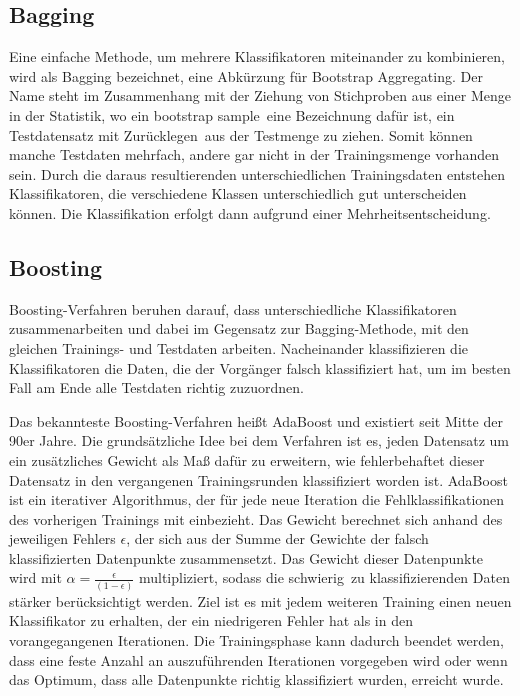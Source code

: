 \subsection*{Bagging}
Eine einfache Methode, um mehrere Klassifikatoren miteinander zu kombinieren, wird als Bagging bezeichnet, eine Abkürzung für Bootstrap Aggregating. Der Name steht im Zusammenhang mit der Ziehung von Stichproben aus einer Menge in der Statistik, wo ein \glqq bootstrap sample\grqq\ eine Bezeichnung dafür ist, ein Testdatensatz \glqq mit Zurücklegen\grqq\ aus der Testmenge zu ziehen. Somit können manche Testdaten mehrfach, andere gar nicht in der Trainingsmenge vorhanden sein. Durch die daraus resultierenden unterschiedlichen Trainingsdaten entstehen Klassifikatoren, die verschiedene Klassen unterschiedlich gut unterscheiden können. Die Klassifikation erfolgt dann aufgrund einer Mehrheitsentscheidung.

\subsection*{Boosting}
Boosting-Verfahren beruhen darauf, dass unterschiedliche Klassifikatoren zusammenarbeiten und dabei im Gegensatz zur Bagging-Methode, mit den gleichen Trainings- und Testdaten arbeiten. Nacheinander klassifizieren die Klassifikatoren die Daten, die der Vorgänger falsch klassifiziert hat, um im besten Fall am Ende alle Testdaten richtig zuzuordnen.

Das bekannteste Boosting-Verfahren heißt AdaBoost und existiert seit Mitte der 90er Jahre. Die grundsätzliche Idee bei dem Verfahren ist es, jeden Datensatz um ein zusätzliches Gewicht als Maß dafür zu erweitern, wie fehlerbehaftet dieser Datensatz in den vergangenen Trainingsrunden klassifiziert worden ist. AdaBoost ist ein iterativer Algorithmus, der für jede neue Iteration die Fehlklassifikationen des vorherigen Trainings mit einbezieht. Das Gewicht berechnet sich anhand des jeweiligen Fehlers $\epsilon$, der sich aus der Summe der Gewichte der falsch klassifizierten Datenpunkte zusammensetzt. Das Gewicht dieser Datenpunkte wird mit
$ \alpha = \frac{\epsilon}{(1-\epsilon)} $ 
multipliziert, sodass die \glqq schwierig\grqq\ zu klassifizierenden Daten stärker berücksichtigt werden. Ziel ist es mit jedem weiteren Training einen neuen Klassifikator zu erhalten, der ein niedrigeren Fehler hat als in den vorangegangenen Iterationen. Die Trainingsphase kann dadurch beendet werden, dass eine feste Anzahl an auszuführenden Iterationen vorgegeben wird oder wenn das Optimum, dass alle Datenpunkte richtig klassifiziert wurden, erreicht wurde.

